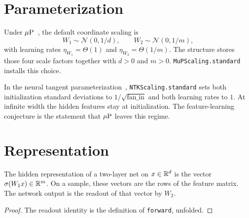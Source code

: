 \chapter{Parameterization}

\begin{definition}\label{def:mup_scaling}
\leanok
{}
Under $\mu\mathrm{P}$~\cite{yang2021tensor4,yang2022tensor5}, the default coordinate scaling is
\[
W_1\sim\mathcal{N}(0,1/d),\qquad
W_2\sim\mathcal{N}(0,1/m),
\]
with learning rates $\eta_{W_1}=\Theta(1)$ and $\eta_{W_2}=\Theta(1/m)$. The structure stores those four scale factors together with $d>0$ and $m>0$. \texttt{MuPScaling.standard} installs this choice.
\end{definition}

\begin{definition}\label{def:ntk_scaling}
\leanok
{}
In the neural tangent parameterization~\cite{jacot2018neural,yang2021tensor4}, \texttt{NTKScaling.standard} sets both initialization standard deviations to $1/\sqrt{\mathrm{fan\_in}}$ and both learning rates to $1$. At infinite width the hidden features stay at initialization. The feature-learning conjecture is the statement that $\mu\mathrm{P}$ leaves this regime.
\end{definition}

\chapter{Representation}

\begin{definition}\label{def:features}
\leanok
{}
The hidden representation of a two-layer net on $x\in\mathbb{R}^d$ is the vector $\sigma(W_1 x)\in\mathbb{R}^m$. On a sample, these vectors are the rows of the feature matrix. The network output is the readout of that vector by $W_2$.
\end{definition}
\begin{proof}
\leanok
The readout identity is the definition of \texttt{forward}, unfolded.
\end{proof}

